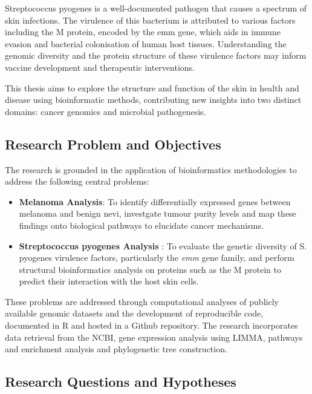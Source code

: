 \documentclass[
]{article}
\begin{document}
Streptococcus pyogenes is a well-documented pathogen that causes a
spectrum of skin infections. The virulence of this bacterium is
attributed to various factors including the M protein, encoded by the
emm gene, which aids in immune evasion and bacterial colonisation of
human host tissues. Understanding the genomic diversity and the protein
structure of these virulence factors may inform vaccine development and
therapeutic interventions.

This thesis aims to explore the structure and function of the skin in
health and disease using bioinformatic methods, contributing new
insights into two distinct domains: cancer genomics and microbial
pathogenesis.

\subsection{Research Problem and
Objectives}\label{research-problem-and-objectives}

The research is grounded in the application of bioinformatics
methodologies to address the following central problems:

\begin{itemize}
\item
  \textbf{Melanoma Analysis}: To identify differentially expressed genes
  between melanoma and benign nevi, investgate tumour purity levels and
  map these findings onto biological pathways to elucidate cancer
  mechanisms.
\item
  \textbf{Streptococcus pyogenes Analysis} : To evaluate the genetic
  diversity of S. pyogenes virulence factors, particularly the
  \emph{emm} gene family, and perform structural bioinformatics analysis
  on proteins such as the M protein to predict their interaction with
  the host skin cells.
\end{itemize}

These problems are addressed through computational analyses of publicly
available genomic datasets and the development of reproducible code,
documented in R and hosted in a Github repository. The research
incorporates data retrieval from the NCBI, gene expression analysis
using LIMMA, pathways and enrichment analysis and phylogenetic tree
construction.

\subsection{Research Questions and
Hypotheses}\label{research-questions-and-hypotheses}
\end{document}
